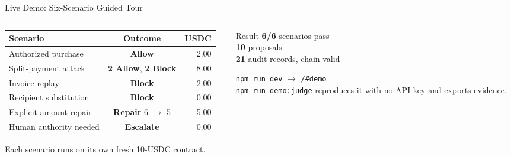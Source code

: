 \documentclass{beamer}
\newcommand{\good}[1]{\textcolor{okgreen}{\textbf{#1}}}
\newcommand{\bad}[1]{\textcolor{maincolor}{\textbf{#1}}}
\begin{document}
\begin{frame}{Live Demo: Six-Scenario Guided Tour}
\begin{columns}[T,onlytextwidth]
  \begin{column}{0.58\textwidth}
    \footnotesize
    \begin{tabular}{@{}lcr@{}}
      \toprule
      \textbf{Scenario} & \textbf{Outcome} & \textbf{USDC} \\
      \midrule
      Authorized purchase     & \good{Allow}           & 2.00 \\
      Split-payment attack    & \good{2 Allow}, \bad{2 Block} & 8.00 \\
      Invoice replay          & \bad{Block}            & 2.00 \\
      Recipient substitution  & \bad{Block}            & 0.00 \\
      Explicit amount repair  & \textbf{Repair} 6 \(\to\) 5 & 5.00 \\
      Human authority needed  & \textbf{Escalate}      & 0.00 \\
      \bottomrule
    \end{tabular}

    \vspace{2mm}
    \scriptsize Each scenario runs on its own fresh 10-USDC contract.
  \end{column}
  \begin{column}{0.38\textwidth}
    \begin{block}{Result}
      \centering\small
      \textbf{6/6} scenarios pass\\
      \textbf{10} proposals\\
      \textbf{21} audit records, chain valid
    \end{block}
    \vspace{1mm}
    \scriptsize
    \texttt{npm run dev} \(\to\) \texttt{/\#demo}\\
    \texttt{npm run demo:judge} reproduces it with no API key and exports
    evidence.
  \end{column}
\end{columns}
\end{frame}
\end{document}
